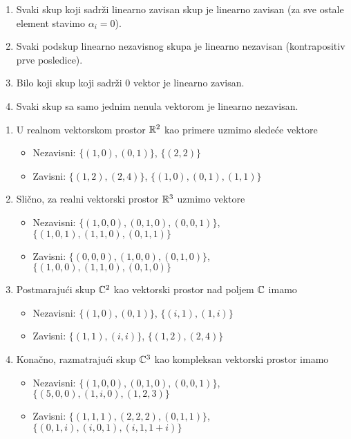 \documentclass{article}
\begin{document}
\begin{corollary}
  \begin{enumerate}
    \item Svaki skup koji sadrži linearno zavisan skup je linearno zavisan (za sve ostale element stavimo $\alpha_i = 0$).
    \item Svaki podskup linearno nezavisnog skupa je linearno nezavisan (kontrapositiv prve posledice).
    \item Bilo koji skup koji sadrži $0$ vektor je linearno zavisan.
    \item Svaki skup sa samo jednim nenula vektorom je linearno nezavisan.
  \end{enumerate}
\end{corollary}

\begin{example}
  \begin{enumerate}
    \item U realnom vektorskom prostor $\mathbb{R}^2$ kao primere uzmimo sledeće vektore
      \begin{itemize}
        \item Nezavisni: $\{(1, 0), (0, 1)\}$, $\{(2, 2)\}$
        \item Zavisni: $\{(1, 2), (2, 4)\}$, $\{(1, 0), (0, 1), (1, 1)\}$
      \end{itemize}
    \item Slično, za realni vektorski prostor $\mathbb{R}^3$ uzmimo vektore
      \begin{itemize}
        \item Nezavisni: $\{(1, 0, 0), (0, 1, 0), (0, 0, 1)\}$, $\{(1, 0, 1), (1, 1, 0), (0, 1, 1)\}$
        \item Zavisni: $\{(0, 0, 0), (1, 0, 0), (0, 1, 0)\}$, $\{(1, 0, 0), (1, 1, 0), (0, 1, 0)\}$
      \end{itemize}
    \item Postmarajući skup $\mathbb{C}^2$ kao vektorski prostor nad poljem $\mathbb{C}$ imamo
      \begin{itemize}
        \item Nezavisni: $\{(1, 0), (0, 1)\}$, $\{(i, 1), (1, i)\}$
        \item Zavisni: $\{(1, 1), (i, i)\}$, $\{(1, 2), (2, 4)\}$
      \end{itemize}
    \item Konačno, razmatrajući skup $\mathbb{C}^3$ kao kompleksan vektorski prostor imamo
      \begin{itemize}
        \item Nezavisni: $\{(1, 0, 0), (0, 1, 0), (0, 0, 1)\}$, $\{(5, 0, 0), (1, i, 0), (1, 2, 3)\}$
        \item Zavisni: $\{(1, 1, 1), (2, 2, 2), (0, 1, 1)\}$, $\{(0, 1, i), (i, 0, 1), (i, 1, 1 + i)\}$
      \end{itemize}
  \end{enumerate}
\end{example}
\end{document}
